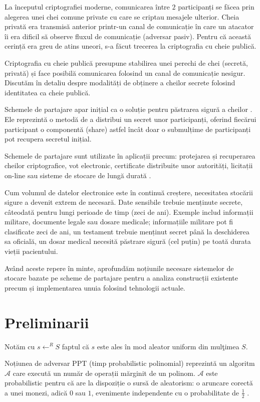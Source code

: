 \documentclass[oneside, 12pt]{book}
\begin{document}
La începutul criptografiei moderne, comunicarea între $2$ participanți se făcea prin alegerea unei chei comune private cu care se criptau mesajele ulterior. Cheia privată era transmisă anterior printr-un canal de comunicație în care un atacator îi era dificil să observe fluxul de comunicație (adversar pasiv). Pentru că această cerință era greu de atins uneori, s-a făcut trecerea la criptografia cu cheie publică.

Criptografia cu cheie publică presupune stabilirea unei perechi de chei (secretă, privată) și face posibilă comunicarea folosind un canal de comunicație nesigur. Discutăm în detaliu despre modalități de obținere a cheilor secrete folosind identitatea ca cheie publică.

Schemele de partajare apar inițial ca o soluție pentru păstrarea sigură a cheilor \cite{S:1979, B:1979}. Ele reprezintă o metodă de a distribui un secret unor participanți, oferind fiecărui participant o componentă (share) astfel încât doar o submulțime de participanți pot recupera secretul inițial.

Schemele de partajare sunt utilizate în aplicații precum: protejarea și recuperarea cheilor criptografice, vot electronic, certificate distribuite unor autorități, licitații on-line sau sisteme de stocare de lungă durată \cite{Martin:2008}. 

Cum volumul de datelor electronice este în continuă creștere, necesitatea stocării sigure a devenit extrem de necesară. Date sensibile trebuie menținute secrete, câteodată pentru lungi perioade de timp (zeci de ani). Exemple includ informații militare, documente legale sau dosare medicale; informațiile militare pot fi clasificate zeci de ani, un testament trebuie menținut secret până la deschiderea sa oficială, un dosar medical necesită păstrare sigură (cel puțin) pe toată durata vieții pacientului.

Având aceste repere în minte, aprofundăm noțiunile necesare sistemelor de stocare bazate pe scheme de partajare pentru a analiza construcții existente precum și implementarea unuia folosind tehnologii actuale.


\section*{Preliminarii}

Notăm cu $s \leftarrow^R S$ faptul că $s$ este ales în mod aleator uniform din mulţimea $S$. 

Noțiunea de adversar PPT (timp probabilistic polinomial) reprezintă un algoritm $\mathcal{A}$ care execută un număr de operații mărginit de un polinom. $\mathcal{A}$ este probabilistic pentru că are la dispoziție o sursă de aleatorism: o aruncare corectă a unei monezi, adică $0$ sau $1$, evenimente independente cu o probabilitate de $\frac{1}{2}$ \cite{Katz:2007}.
\end{document}
